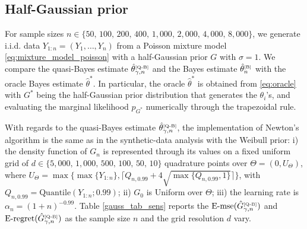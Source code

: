 \documentclass[twoside,12pt]{article}
\begin{document}
\subsection{Half-Gaussian prior}

For sample sizes $n\in\{50,\,100,\,200,\,400,\,1,000,\,2,000,\,4,000,\,8,000\}$, we generate i.i.d. data $Y_{1:n}=(Y_{1},\ldots,Y_{n})$ from a Poisson mixture model \eqref{eq:mixture_model_poisson} with a half-Gaussian prior $G$ with $\sigma=1$. We compare the quasi-Bayes estimate $\hat{\theta}^{\text{\tiny{[Q-B]}}}_{\gamma,n}$ and the Bayes estimate $\hat{\theta}^{\text{\tiny{[B]}}}_{n}$ with the oracle Bayes estimate $\hat{\theta}^{\ast}$. In particular, the oracle $\hat{\theta}^{\ast}$ is obtained from \eqref{eq:oracle} with $G^{\ast}$ being the half-Gaussian prior distribution that generates the $\theta_{i}$'s, and evaluating the marginal likelihood $p_{G^\ast}$ numerically through the trapezoidal rule.

With regards to the quasi-Bayes estimate $\hat{\theta}^{\text{\tiny{[Q-B]}}}_{\gamma,n}$,  the implementation of Newton's algorithm is the same as in the synthetic-data analysis with the Weibull prior: i) the density function of $G_{n}$ is represented through its values on a fixed uniform grid of $d\in\{5,000,\,1,000,\,500,\,100,\,50,\,10\}$ quadrature points over $\Theta=(0,U_{\Theta})$, where $U_\Theta=\max\{\max\{Y_{1:n}\},\lceil Q_{n,0.99}+4\sqrt{\max\{Q_{n,0.99},1\}}\rceil\}$, with $Q_{n,0.99}=\text{Quantile}(Y_{1:n};0.99)$; ii) $G_{0}$ is Uniform over $\Theta$; iii) the learning rate is $\alpha_{n}=(1+n)^{-0.99}$. Table \ref{gauss_tab_sens} reports the $\mathrm{E\text{-}mse}(\hat{G}_{\gamma,n}^{\text{\tiny{[Q-B]}}})$ and $\mathrm{E\text{-}regret}(\hat{G}_{\gamma,n}^{\text{\tiny{[Q-B]}}})$ as the sample size $n$ and the grid resolution $d$ vary.
\end{document}
